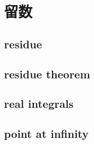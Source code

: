 \section{留数}
\label{b3:sec:0303}


\subsection{residue}
\label{b3:subsec:030301}

\subsection{residue theorem}
\label{b3:subsec:030302}

\subsection{real integrals}
\label{b3:subsec:030303}

\subsection{point at infinity}
\label{b3:subsec:030304}


